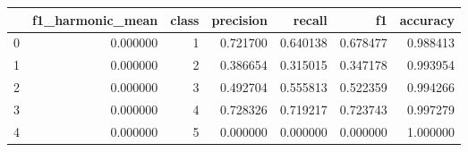 \begin{tabular}{lrrrrrr}
\toprule
 & f1_harmonic_mean & class & precision & recall & f1 & accuracy \\
\midrule
0 & 0.000000 & 1 & 0.721700 & 0.640138 & 0.678477 & 0.988413 \\
1 & 0.000000 & 2 & 0.386654 & 0.315015 & 0.347178 & 0.993954 \\
2 & 0.000000 & 3 & 0.492704 & 0.555813 & 0.522359 & 0.994266 \\
3 & 0.000000 & 4 & 0.728326 & 0.719217 & 0.723743 & 0.997279 \\
4 & 0.000000 & 5 & 0.000000 & 0.000000 & 0.000000 & 1.000000 \\
\bottomrule
\end{tabular}
